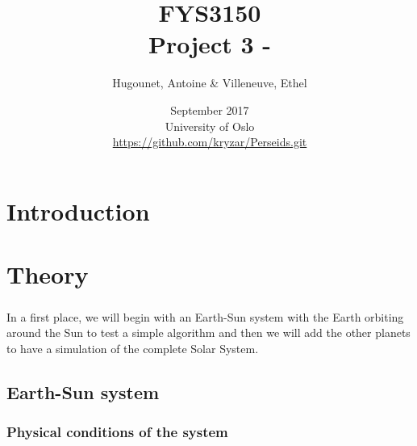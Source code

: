 \documentclass[a4paper, twoside, 11pt]{report}
\title{FYS3150\\Project 3 - }
\author{Hugounet, Antoine \& Villeneuve, Ethel}
\date{September 2017 \\University of Oslo \\ \url{https://github.com/kryzar/Perseids.git}}
\theoremstyle{theorem}
\theoremstyle{remark}
\theoremstyle{exemple}
\begin{document}
\maketitle
	
	
\begin{abstract}

	\paragraph{}
	
\end{abstract}


\tableofcontents


\chapter*{Introduction}

    \paragraph{}
    

\chapter{Theory}
    
    \paragraph{}In a first place, we will begin with an Earth-Sun system with the Earth orbiting around the Sun to test a simple algorithm and then we will add the other planets to have a simulation of the complete Solar System. 

    \section{Earth-Sun system}
        \subsection{Physical conditions of the system}
\end{document}

